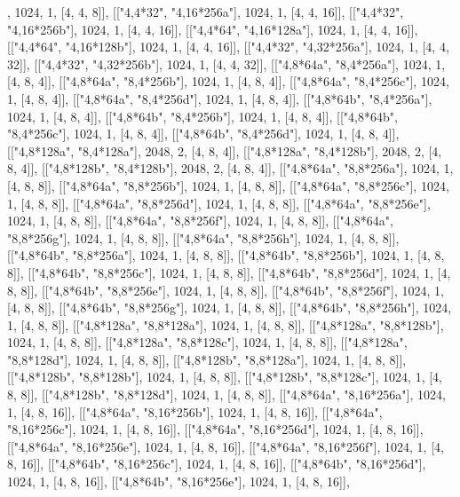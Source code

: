 \documentclass[11pt,a4paper]{article}
\begin{document}
\begin{CompleteProgram}
[["{4,4}*128", "{4,8}*64b"], 1024, 1, [4, 4, 8]],
[["{4,4}*32", "{4,16}*256a"], 1024, 1, [4, 4, 16]],
[["{4,4}*32", "{4,16}*256b"], 1024, 1, [4, 4, 16]],
[["{4,4}*64", "{4,16}*128a"], 1024, 1, [4, 4, 16]],
[["{4,4}*64", "{4,16}*128b"], 1024, 1, [4, 4, 16]],
[["{4,4}*32", "{4,32}*256a"], 1024, 1, [4, 4, 32]],
[["{4,4}*32", "{4,32}*256b"], 1024, 1, [4, 4, 32]],
[["{4,8}*64a", "{8,4}*256a"], 1024, 1, [4, 8, 4]],
[["{4,8}*64a", "{8,4}*256b"], 1024, 1, [4, 8, 4]],
[["{4,8}*64a", "{8,4}*256c"], 1024, 1, [4, 8, 4]],
[["{4,8}*64a", "{8,4}*256d"], 1024, 1, [4, 8, 4]],
[["{4,8}*64b", "{8,4}*256a"], 1024, 1, [4, 8, 4]],
[["{4,8}*64b", "{8,4}*256b"], 1024, 1, [4, 8, 4]],
[["{4,8}*64b", "{8,4}*256c"], 1024, 1, [4, 8, 4]],
[["{4,8}*64b", "{8,4}*256d"], 1024, 1, [4, 8, 4]],
[["{4,8}*128a", "{8,4}*128a"], 2048, 2, [4, 8, 4]],
[["{4,8}*128a", "{8,4}*128b"], 2048, 2, [4, 8, 4]],
[["{4,8}*128b", "{8,4}*128b"], 2048, 2, [4, 8, 4]],
[["{4,8}*64a", "{8,8}*256a"], 1024, 1, [4, 8, 8]],
[["{4,8}*64a", "{8,8}*256b"], 1024, 1, [4, 8, 8]],
[["{4,8}*64a", "{8,8}*256c"], 1024, 1, [4, 8, 8]],
[["{4,8}*64a", "{8,8}*256d"], 1024, 1, [4, 8, 8]],
[["{4,8}*64a", "{8,8}*256e"], 1024, 1, [4, 8, 8]],
[["{4,8}*64a", "{8,8}*256f"], 1024, 1, [4, 8, 8]],
[["{4,8}*64a", "{8,8}*256g"], 1024, 1, [4, 8, 8]],
[["{4,8}*64a", "{8,8}*256h"], 1024, 1, [4, 8, 8]],
[["{4,8}*64b", "{8,8}*256a"], 1024, 1, [4, 8, 8]],
[["{4,8}*64b", "{8,8}*256b"], 1024, 1, [4, 8, 8]],
[["{4,8}*64b", "{8,8}*256c"], 1024, 1, [4, 8, 8]],
[["{4,8}*64b", "{8,8}*256d"], 1024, 1, [4, 8, 8]],
[["{4,8}*64b", "{8,8}*256e"], 1024, 1, [4, 8, 8]],
[["{4,8}*64b", "{8,8}*256f"], 1024, 1, [4, 8, 8]],
[["{4,8}*64b", "{8,8}*256g"], 1024, 1, [4, 8, 8]],
[["{4,8}*64b", "{8,8}*256h"], 1024, 1, [4, 8, 8]],
[["{4,8}*128a", "{8,8}*128a"], 1024, 1, [4, 8, 8]],
[["{4,8}*128a", "{8,8}*128b"], 1024, 1, [4, 8, 8]],
[["{4,8}*128a", "{8,8}*128c"], 1024, 1, [4, 8, 8]],
[["{4,8}*128a", "{8,8}*128d"], 1024, 1, [4, 8, 8]],
[["{4,8}*128b", "{8,8}*128a"], 1024, 1, [4, 8, 8]],
[["{4,8}*128b", "{8,8}*128b"], 1024, 1, [4, 8, 8]],
[["{4,8}*128b", "{8,8}*128c"], 1024, 1, [4, 8, 8]],
[["{4,8}*128b", "{8,8}*128d"], 1024, 1, [4, 8, 8]],
[["{4,8}*64a", "{8,16}*256a"], 1024, 1, [4, 8, 16]],
[["{4,8}*64a", "{8,16}*256b"], 1024, 1, [4, 8, 16]],
[["{4,8}*64a", "{8,16}*256c"], 1024, 1, [4, 8, 16]],
[["{4,8}*64a", "{8,16}*256d"], 1024, 1, [4, 8, 16]],
[["{4,8}*64a", "{8,16}*256e"], 1024, 1, [4, 8, 16]],
[["{4,8}*64a", "{8,16}*256f"], 1024, 1, [4, 8, 16]],
[["{4,8}*64b", "{8,16}*256c"], 1024, 1, [4, 8, 16]],
[["{4,8}*64b", "{8,16}*256d"], 1024, 1, [4, 8, 16]],
[["{4,8}*64b", "{8,16}*256e"], 1024, 1, [4, 8, 16]],

\end{CompleteProgram}
\end{document}
